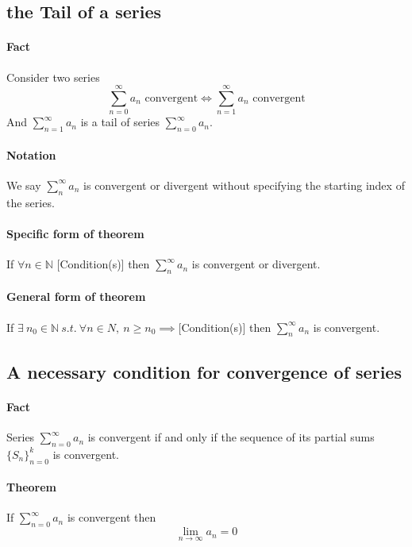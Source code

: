\documentclass{article}
\newcommand{\theorem}[0]{\paragraph{Theorem}}
\newcommand{\sequence}[3]{\{#1_{n}\}_{n={#2}}^{#3}}
\newcommand{\N}[0]{\mathbb{N}}
\newcommand{\series}[2]{\sum_{#1}^{\infty}{#2}}
\begin{document}
\subsection{the Tail of a series}
\paragraph{Fact} Consider two series
\[
	\series{n=0}{a_n}\text{ convergent} \iff \series{n=1}{a_n} \text{ convergent}
\]
And $\series{n=1}{a_n}$ is a tail of series $\series{n=0}{a_n}$.
\paragraph{Notation} We say $\series{n}{a_n}$ is convergent or divergent without specifying the starting index of the series.
\paragraph{Specific form of theorem} If $\forall n \in \N$ [Condition(s)] then $\series{n}{a_n}$ is convergent or divergent.
\paragraph{General form of theorem} If $\exists\ n_0 \in \N\ s.t.\ \forall n \in N,\ n \geq n_0 \implies $[Condition(s)] then $\series{n}{a_n}$ is convergent.

\subsection{A necessary condition for convergence of series}
\paragraph{Fact} Series $\series{n=0}{a_n}$ is convergent if and only if the sequence of its partial sums $\sequence{S}{0}{k}$ is convergent.

\theorem If $\series{n=0}{a_n}$ is convergent then
\[
	\lim_{n\to\infty}{a_n} = 0
\]
\end{document}
